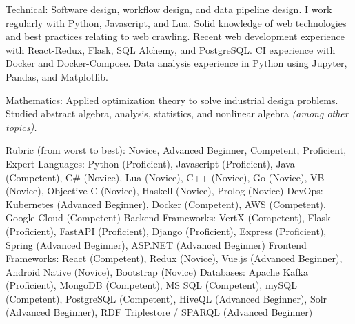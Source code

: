 \documentclass[10pt,a4paper]{article} %
\begin{document}

\inlineheadsection %
{Technical:}
{Software design, workflow design, and data pipeline design. I work regularly with Python, Javascript, and Lua. Solid knowledge of web technologies and best practices relating to web crawling. Recent web development experience with React-Redux, Flask, SQL Alchemy, and PostgreSQL. CI experience with Docker and Docker-Compose. Data analysis experience in Python using Jupyter, Pandas, and Matplotlib.}


\inlineheadsection %
{Mathematics:}
{Applied optimization theory to solve industrial design problems. Studied abstract algebra, analysis, statistics, and nonlinear algebra \textit{(among other topics).}}


Rubric (from worst to best): Novice, Advanced Beginner, Competent, Proficient, Expert
\inlineheadsection %
{Languages:}
{Python (Proficient), Javascript (Proficient), Java (Competent), C\# (Novice), Lua (Novice), C++ (Novice), Go (Novice), VB (Novice), Objective-C (Novice), Haskell (Novice), Prolog (Novice)}
\inlineheadsection %
{DevOps:}
{Kubernetes (Advanced Beginner), Docker (Competent), AWS (Competent), Google Cloud (Competent)}
\inlineheadsection %
{Backend Frameworks:}
{VertX (Competent), Flask (Proficient), FastAPI (Proficient), Django (Proficient), Express (Proficient), Spring (Advanced Beginner), ASP.NET (Advanced Beginner)}
\inlineheadsection %
{Frontend Frameworks:}
{React (Competent), Redux (Novice), Vue.js (Advanced Beginner), Android Native (Novice), Bootstrap (Novice)}
\inlineheadsection %
{Databases:}
{Apache Kafka (Proficient), MongoDB (Competent), MS SQL (Competent), mySQL (Competent), PostgreSQL (Competent), HiveQL (Advanced Beginner), Solr (Advanced Beginner), RDF Triplestore / SPARQL (Advanced Beginner)}

\spacedhrule{1.6em}{-0.4em} %

\end{document}
